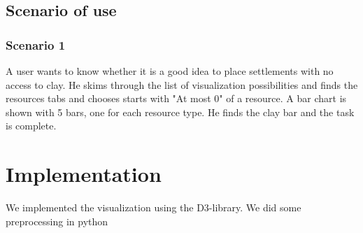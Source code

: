 \documentclass{article}
\begin{document}
\subsection{Scenario of use}

\subsubsection{Scenario 1}
A user wants to know whether it is a good idea to place settlements with no
access to clay. He skims through the list of visualization possibilities
and finds the resources tabs and chooses starts with "At most 0" of a
resource. A bar chart is shown with 5 bars, one for each resource type. He
finds the clay bar and the task is complete.

\section{Implementation}

We implemented the visualization using the D3-library. We did some
preprocessing in python 
\end{document}
